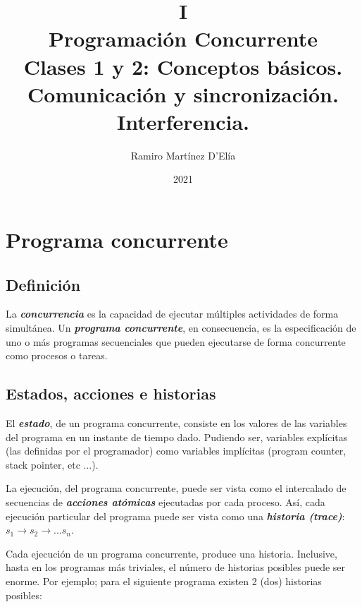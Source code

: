 \documentclass[a4paper, 10pt]{report}
\begin{document}
\title{
    I\\
    Programación Concurrente\\
    \large Clases 1 y 2: Conceptos básicos. Comunicación y sincronización. Interferencia.
}

\author{Ramiro Martínez D'Elía}
\date{2021}
\maketitle

\tableofcontents

\chapter{Programa concurrente}

\section{Definición}

La \textbf{\emph{concurrencia}} es la capacidad de ejecutar múltiples actividades de forma simultánea. Un \textbf{\emph{programa concurrente}}, en consecuencia, es la especificación de uno o más programas secuenciales que pueden ejecutarse de forma concurrente como procesos o tareas.

\section{Estados, acciones e historias}

El \textbf{\emph{estado}}, de un programa concurrente, consiste en los valores de las variables del programa en un instante de tiempo dado. Pudiendo ser, variables explícitas (las definidas por el programador) como variables implícitas (program counter, stack pointer, etc ...).

La ejecución, del programa concurrente, puede ser vista como el intercalado de secuencias de \textbf{\emph{acciones atómicas}} ejecutadas por cada proceso. Así, cada ejecución particular del programa puede ser vista como una \textbf{\emph{historia (trace)}}: $s_1 \rightarrow s_2 \rightarrow ... s_n$.

Cada ejecución de un programa concurrente, produce una historia. Inclusive, hasta en los programas más triviales, el número de historias posibles puede ser enorme. Por ejemplo; para el siguiente programa existen 2 (dos) historias posibles: 
\end{document}
